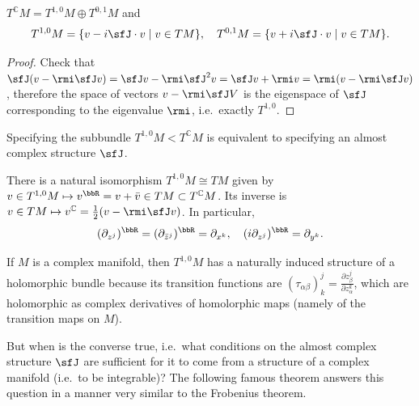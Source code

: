\begin{prop}
    $T^\mathbb{C}M=T^{1,0}M\oplus T^{0,1}M$ and 
    \[T^{1,0}M=\{v-i\sfJ\cdot v\mid v\in TM \}, \quad T^{0,1}M=\{v+i\sfJ\cdot v\mid v\in TM \}.\]
\end{prop}
\begin{proof}
    Check that $\sfJ(v-\rmi\sfJ v)=\sfJ v-\rmi\sfJ^2v=\sfJ v+\rmi v=\rmi(v-\rmi\sfJ v)$, therefore the space of vectors $v-\rmi\sfJ V$ is the eigenspace of $\sfJ$ corresponding to the eigenvalue $\rmi$, i.e.\ exactly $T^{1,0}$.
\end{proof}

Specifying the subbundle $T^{1,0}M<T^\mathbb{C}M$ is equivalent to specifying an almost complex structure $\sfJ$.

There is a natural isomorphism $T^{1,0}M\cong TM$ given by $v\in T^{1,0}M\mapsto v^\bbR =v+\bar v\in TM\subset T^\mathbb{C} M$. Its inverse is $v\in TM\mapsto v^\mathbb{C}=\frac12(v-\rmi\sfJ v)$. In particular,
\[(\partial_{z^j})^\bbR =(\partial_{\bar z^j})^\bbR =\partial_{x^k},\quad (i\partial_{z^j})^\bbR =\partial_{y^k}.\]

If $M$ is a complex manifold, then $T^{1,0}M$ has a naturally induced structure of a holomorphic bundle because its transition functions are $(\tau_{\alpha\beta})^j_k=\frac{\partial z_\beta^j}{\partial z_\alpha^k}$, which are holomorphic as complex derivatives of homolorphic maps (namely of the transition maps on $M$).

But when is the converse true, i.e.\ what conditions on the almost complex structure $\sfJ$ are sufficient for it to come from a structure of a complex manifold (i.e.\ to be integrable)? The following famous theorem answers this question in a manner very similar to the Frobenius theorem.

